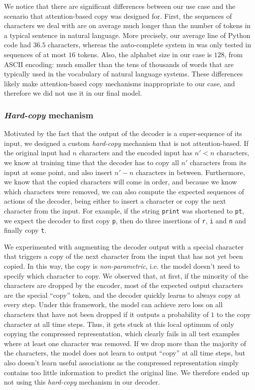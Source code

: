 \documentclass{article}
\begin{document}
We notice that there are significant differences
between our use case and the scenario
that attention-based copy was designed
for. First, the sequences
of characters we deal with are on average
much longer than the number of tokens
in a typical sentence in natural language.
More precisely, our average line of Python
code had $36.5$ characters, whereas the
auto-complete system in \cite{lee2019learning} was only tested
in sequences of at most $16$ tokens.
Also, the alphabet size in our case
is $128$, from ASCII encoding: much smaller than the tens of thousands of words that are
typically used in the vocabulary of
natural language systems. These differences
likely make attention-based copy mechanisms
inappropriate to our case, and therefore
we did not use it in our final model.

\subsubsection{\emph{Hard-copy} mechanism}

Motivated by the fact that the output
of the decoder is a super-sequence of
its input, we designed a custom
\emph{hard-copy}
mechanism that is not attention-based.
If the original input had $n$ characters
and the encoded input has $n' < n$ characters, we know at training time that
the decoder has to copy all $n'$ characters
from its input at some point, and also insert $n' - n$ characters in between.
Furthermore, we know that the copied
characters will come in order, and because
we know which characters were removed,
we can also compute the expected sequences
of actions of the decoder, being either
to insert a character or copy the next
character from the input. For example,
if the string \texttt{print} was shortened
to \texttt{pt}, we expect the decoder to
first copy \texttt{p}, then do three insertions of \texttt{r}, \texttt{i}
and \texttt{n} and finally copy \texttt{t}.

We experimented with augmenting the decoder
output with a special character that triggers
a copy of the next character from the input
that has not yet been copied.
In this way, the copy is \emph{non-parametric},
i.e. the model doesn't need to specify which
character to copy.
We observed that,
at first, if the minority of the
characters are dropped by the encoder,
most of the expected output characters are the
special ``copy'' token, and the decoder quickly
learns to always copy at every step.
Under this framework, the model can
achieve zero loss on all characters that
have not been dropped if it outputs
a probability of $1$ to the copy character
at all time steps. Thus, it gets stuck
at this local optimum of only copying the compressed representation, which clearly
fails in all test examples where at least
one character was removed. If we drop
more than the majority of the characters,
the model does not learn to output ``copy''
at all time steps, but also doesn't learn
useful associations as the compressed representation simply
contains too little information to predict
the original line. We therefore
ended up not using this \emph{hard-copy}
mechanism in our decoder.
\end{document}
